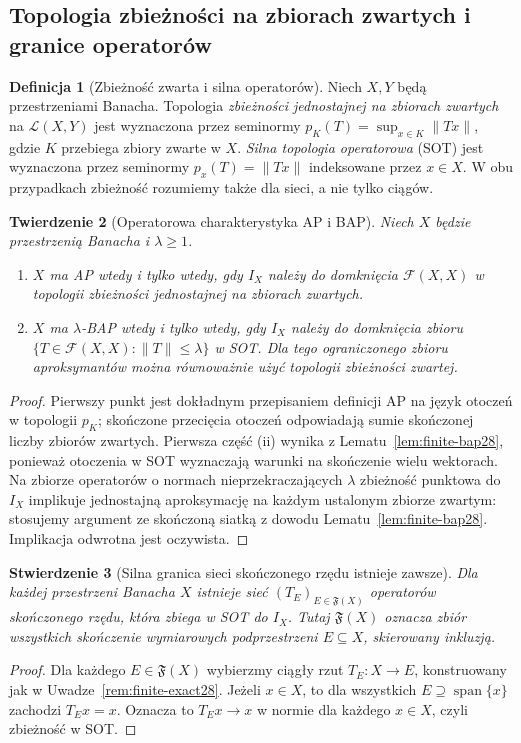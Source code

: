 \documentclass[11pt,a4paper]{article}
\numberwithin{equation}{section}
\theoremstyle{plain}
\newtheorem{twierdzenie}{Twierdzenie}[section]
\newtheorem{stwierdzenie}[twierdzenie]{Stwierdzenie}
\theoremstyle{definition}
\newtheorem{definicja}[twierdzenie]{Definicja}
\theoremstyle{remark}
\begin{document}
\subsection{Topologia zbieżności na zbiorach zwartych i granice operatorów}

\begin{definicja}[Zbieżność zwarta i silna operatorów]
\label{def:topologies-ap28}
Niech $X,Y$ będą przestrzeniami Banacha. Topologia
\emph{zbieżności jednostajnej na zbiorach zwartych}
na $\mathcal L(X,Y)$ jest wyznaczona przez seminormy
$p_K(T)=\sup_{x\in K}\|Tx\|$, gdzie $K$ przebiega
zbiory zwarte w $X$. \emph{Silna topologia operatorowa}
(SOT) jest wyznaczona przez seminormy $p_x(T)=\|Tx\|$
indeksowane przez $x\in X$. W obu przypadkach
zbieżność rozumiemy także dla sieci, a nie tylko ciągów.
\end{definicja}

\begin{twierdzenie}[Operatorowa charakterystyka AP i BAP]
\label{thm:operator-character-ap28}
Niech $X$ będzie przestrzenią Banacha i $\lambda\ge1$.
\begin{enumerate}[label=\textup{(\roman*)}]
\item $X$ ma AP wtedy i tylko wtedy, gdy
$I_X$ należy do domknięcia $\mathcal F(X,X)$
w topologii zbieżności jednostajnej na zbiorach zwartych.
\item $X$ ma $\lambda$-BAP wtedy i tylko wtedy, gdy
$I_X$ należy do domknięcia zbioru
$\{T\in\mathcal F(X,X):\|T\|\le\lambda\}$ w SOT.
Dla tego ograniczonego zbioru aproksymantów można
równoważnie użyć topologii zbieżności zwartej.
\end{enumerate}
\end{twierdzenie}
\begin{proof}
Pierwszy punkt jest dokładnym przepisaniem definicji AP
na język otoczeń w topologii $p_K$; skończone przecięcia
otoczeń odpowiadają sumie skończonej liczby zbiorów zwartych.
Pierwsza część (ii) wynika z Lematu~\ref{lem:finite-bap28},
ponieważ otoczenia w SOT wyznaczają warunki na skończenie
wielu wektorach. Na zbiorze operatorów o normach
nieprzekraczających $\lambda$ zbieżność punktowa do
$I_X$ implikuje jednostajną aproksymację na każdym
ustalonym zbiorze zwartym: stosujemy argument ze
skończoną siatką z dowodu Lematu~\ref{lem:finite-bap28}.
Implikacja odwrotna jest oczywista.
\end{proof}

\begin{stwierdzenie}[Silna granica sieci skończonego rzędu istnieje zawsze]
\label{prop:universal-sot28}
Dla \emph{każdej} przestrzeni Banacha $X$ istnieje sieć
$(T_E)_{E\in\mathfrak F(X)}$ operatorów skończonego rzędu,
która zbiega w SOT do $I_X$. Tutaj $\mathfrak F(X)$
oznacza zbiór wszystkich skończenie wymiarowych podprzestrzeni
$E\subseteq X$, skierowany inkluzją.
\end{stwierdzenie}
\begin{proof}
Dla każdego $E\in\mathfrak F(X)$ wybierzmy
ciągły rzut $T_E:X\to E$, konstruowany jak
w Uwadze~\ref{rem:finite-exact28}. Jeżeli $x\in X$,
to dla wszystkich $E\supseteq\operatorname{span}\{x\}$
zachodzi $T_Ex=x$. Oznacza to $T_Ex\to x$
w normie dla każdego $x\in X$, czyli zbieżność w SOT.
\end{proof}
\end{document}
